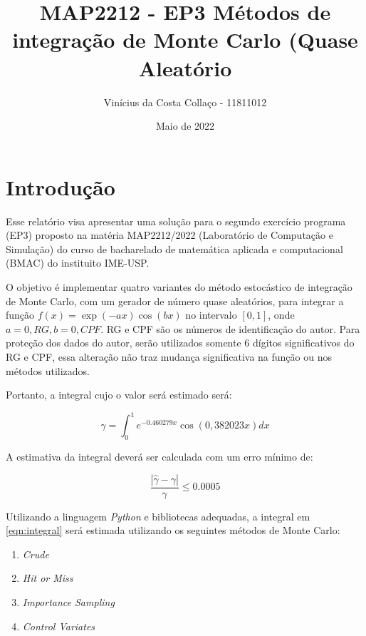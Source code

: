 \documentclass{article}
\title{MAP2212 - EP3 Métodos de integração de Monte Carlo (Quase Aleatório}
\author{Vinícius da Costa Collaço - 11811012}
\date{Maio de 2022}
\begin{document}
\maketitle

\section{Introdução}


Esse relatório visa apresentar uma solução para o segundo exercício programa (EP3) proposto na matéria MAP2212/2022 (Laboratório de Computação e Simulação) do curso de bacharelado de matemática aplicada e computacional (BMAC) do instituito IME-USP.

O objetivo é implementar quatro variantes do método estocástico de integração de Monte Carlo, com um gerador de número quase aleatórios, para integrar a função $f(x) = \exp{(-ax)}\cos{(bx)}$ no intervalo $[0,1]$, onde $a = 0,RG, b = 0,CPF$. RG e CPF são os números de identificação do autor. Para proteção dos dados do autor, serão utilizados somente 6 dígitos significativos do RG e CPF, essa alteração não traz mudança significativa na função ou nos métodos utilizados.

Portanto, a integral cujo o valor será estimado será:

\begin{equation}
    \gamma = \int_0^1 e^{-0.460279x}\cos{(0,382023x)} dx
    \label{eqn:integral}
\end{equation}

A estimativa da integral deverá ser calculada com um erro mínimo de:

\begin{equation}
    \frac{|{\hat{\gamma}-\gamma}|}{\gamma} \leq 0.0005
    \label{eqn:erro}
\end{equation}

Utilizando a linguagem \textit{Python} e bibliotecas adequadas\cite{harris2020array, Waskom2021, Hunter:2007, 2020SciPy-NMeth, FEINBERG201546}, a integral em \ref{eqn:integral} será estimada utilizando os seguintes métodos de Monte Carlo:


\begin{enumerate}
    \item \textit{Crude}
    \item \textit{Hit or Miss}
    \item \textit{Importance Sampling}
    \item \textit{Control Variates}
\end{enumerate}
\end{document}
